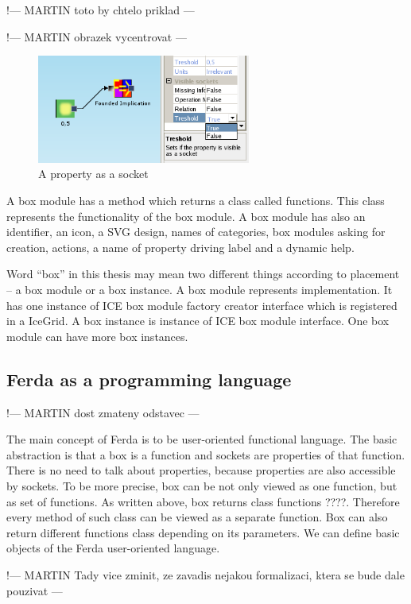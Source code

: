 \documentclass[a4paper,12pt]{book}
\begin{document}
!--- MARTIN toto by chtelo priklad ---

!--- MARTIN obrazek vycentrovat ---

\begin{figure}
	\includegraphics[width=7cm]{property_as_socket}
	\caption{A property as a socket}
	\label{fig:propertyAsASocket}
\end{figure}

A box module has a method which returns a class called functions. This class represents the functionality of the box module. A box module has also an identifier, an icon, a SVG design, names of categories, box modules asking for creation, actions, a name of property driving label and a dynamic help.

Word ``box'' in this thesis may mean two different things according to placement -- a box module or a box instance. A box module represents implementation. It has one instance of ICE box module factory creator interface which is registered in a IceGrid. A box instance is instance of ICE box module interface. One box module can have more box instances.

\subsection{Ferda as a programming language}

!--- MARTIN dost zmateny odstavec ---

The main concept of Ferda is to be user-oriented functional language. The basic abstraction is that a box is a function and sockets are properties of that function. There is no need to talk about properties, because properties are also accessible by sockets. To be more precise, box can be not only viewed as one function, but as set of functions. As written above, box returns class functions ????. Therefore every method of such class can be viewed as a separate function. Box can also return different functions class depending on its parameters. We can define basic objects of the Ferda user-oriented language.

!--- MARTIN Tady vice zminit, ze zavadis nejakou formalizaci, ktera se bude dale pouzivat ---
\end{document}
